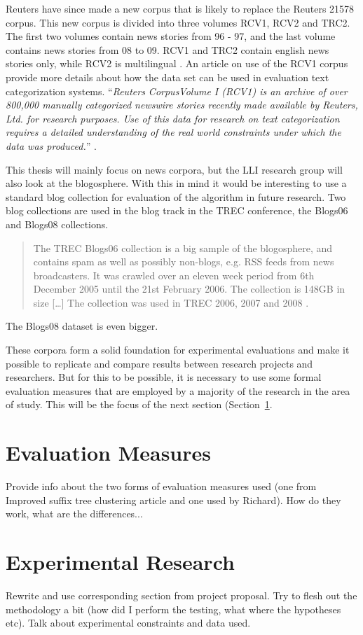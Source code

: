 Reuters have since made a new corpus that is likely to replace the Reuters 21578 corpus. This new corpus is divided into three volumes RCV1, RCV2 and TRC2. The first two volumes contain news stories from 96 - 97, and the last volume contains news stories from 08 to 09. RCV1 and TRC2 contain english news stories only, while RCV2 is multilingual \cite{NationalInstituteofStandardsandTechnology2004}. An article on use of the RCV1 corpus provide more details about how the data set can be used in evaluation text categorization systems. ``\textit{Reuters CorpusVolume I (RCV1) is an archive of over 800,000 manually categorized newswire stories recently made available by Reuters, Ltd. for research purposes. Use of this data for research on text categorization requires a detailed understanding of the real world constraints under which the data was produced.}'' \cite{Lewis2004}. 

This thesis will mainly focus on news corpora, but the LLI research group will also look at the blogosphere. With this in mind it would be interesting to use a standard blog collection for evaluation of the algorithm in future research. Two blog collections are used in the blog track in the TREC conference, the Blogs06 and Blogs08 collections.\begin{quote}
The TREC Blogs06 collection is a big sample of the blogosphere, and contains spam as well as possibly non-blogs, e.g. RSS feeds from news broadcasters. It was crawled over an eleven week period from 6th December 2005 until the 21st February 2006. The collection is 148GB in size [\dots] The collection was used in TREC 2006, 2007 and 2008 \cite{Macdonald2011}.
\end{quote} 
The Blogs08 dataset is even bigger.

These corpora form a solid foundation for experimental evaluations and make it possible to replicate and compare results between research projects and researchers. But for this to be possible, it is necessary to use some formal evaluation measures that are employed by a majority of the research in the area of study. This will be the focus of the next section (Section~\ref{EvaluationMeasures}.

\section{Evaluation Measures}
\label{EvaluationMeasures}
Provide info about the two forms of evaluation measures used (one from Improved suffix tree clustering article and one used by Richard). How do they work, what are the differences...

\section{Experimental Research}
\label{ExperimentalResearch}
Rewrite and use corresponding section from project proposal. Try to flesh out the methodology a bit (how did I perform the testing, what where the hypotheses etc). Talk about experimental constraints and data used.